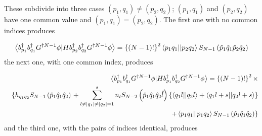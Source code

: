 These subdivide into three cases $\left( p_{1},q_{1}\right) \neq \left(
p_{2},q_{2}\right) $; $\left( p_{1},q_{1}\right) $ and $\left(
p_{2},q_{2}\right) $ have one common value and $\left( p_{1},q_{1}\right)
=\left( p_{2},q_{2}\right) $. The first one with no common indices produces

\begin{equation}
\left\langle b_{p_{1}}^{\dagger }b_{q_{1}}^{\dagger }G^{\dagger N-1}\phi
|Hb_{p_{2}}^{\dagger }b_{q_{2}}^{\dagger }G^{\dagger N-1}\phi \right\rangle
=\left\{ \left( N-1\right) !\right\} ^{2}\left\langle
p_{1}q_{1}||p_{2}q_{2}\right\rangle S_{N-1}\left( \hat{p}_{1}\hat{q}_{1}\hat{%
p}_{2}\hat{q}_{2}\right)
\end{equation}%
the next one, with one common index, produces

\begin{eqnarray}
&&\left\langle b_{p_{1}}^{\dagger }b_{q_{1}}^{\dagger }G^{\dagger N-1}\phi
|Hb_{p_{1}}^{\dagger }b_{q_{2}}^{\dagger }G^{\dagger N-1}\phi \right\rangle
=\left\{ \left( N-1\right) !\right\} ^{2}\times  \nonumber \\
&&\left\{ h_{q_{1}q_{2}}S_{N-1}\left( \hat{p}_{1}\hat{q}_{1}\hat{q}%
_{2}\right) \right. +\sum_{l\neq \left| q_{1}\right| \neq \left|
q_{2}\right| =1}^{s}n_{l}S_{N-2}\left( \hat{p}_{1}\hat{q}_{1}\hat{q}_{2}\hat{%
l}\right) \left\{ \left\langle q_{1}l||q_{2}l\right\rangle +\left\langle
q_{1}l+s||q_{2}l+s\right\rangle \right\}  \nonumber \\
&&\qquad \qquad \qquad \qquad \qquad \qquad \qquad \qquad \qquad \qquad
\quad \qquad \left. +\left\langle p_{1}q_{1}||p_{1}q_{2}\right\rangle
S_{N-1}\left( \hat{p}_{1}\hat{q}_{1}\hat{q}_{2}\right) \right\}
\end{eqnarray}%
and the third one, with the pairs of indices identical, produces 
